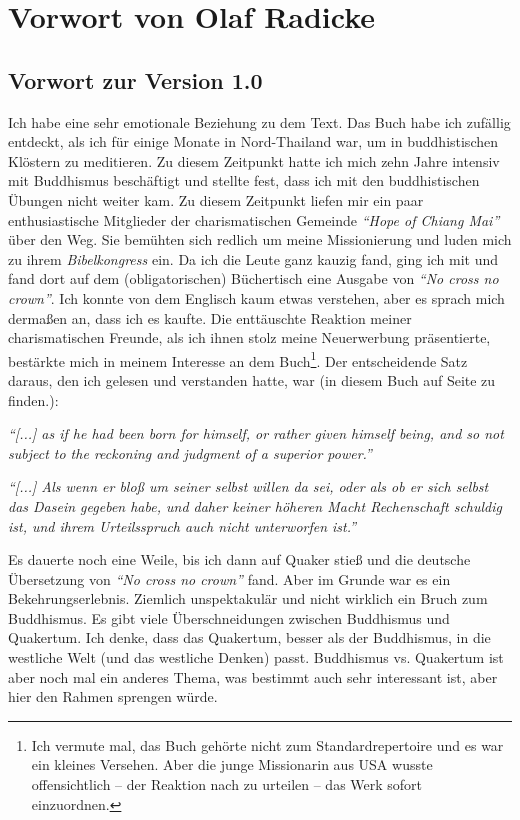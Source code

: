 \part{Vorwort von Olaf Radicke}

\chapter{Vorwort zur Version 1.0}
Ich habe eine sehr emotionale Beziehung zu dem Text. Das Buch habe ich zufällig
entdeckt, als ich für einige Monate in Nord-Thailand war, um in
buddhistischen
Klöstern zu meditieren. Zu diesem Zeitpunkt hatte ich mich zehn Jahre intensiv
mit
Buddhismus beschäftigt und stellte fest, dass ich mit den buddhistischen Übungen
nicht weiter kam. Zu diesem Zeitpunkt liefen mir ein paar enthusiastische
Mitglieder der charismatischen Gemeinde \textit{"`Hope of Chiang Mai"'} über
den Weg. Sie bemühten sich redlich um meine Missionierung und luden mich zu
ihrem \textit{Bibelkongress} ein. Da ich die Leute ganz kauzig fand, ging ich
mit und fand dort auf dem (obligatorischen) Büchertisch eine Ausgabe
von \textit{"`No cross no crown"'}.
Ich konnte von dem Englisch kaum etwas verstehen, aber es sprach mich dermaßen
an, dass ich es kaufte. Die enttäuschte Reaktion meiner charismatischen Freunde,
als ich ihnen stolz meine Neuerwerbung präsentierte, bestärkte mich in meinem
Interesse an dem Buch\footnote{Ich vermute mal, das Buch gehörte nicht zum
Standardrepertoire und es war ein kleines Versehen. Aber die junge Missionarin
aus USA wusste offensichtlich -- der Reaktion nach zu urteilen -- das Werk
sofort einzuordnen.}. Der entscheidende Satz daraus, den ich gelesen und
verstanden hatte, war (in diesem Buch auf
Seite \pageref{ref:vorw_sinndes_lebens} zu finden.):

\begin{center}
\parbox{7,5cm}{
\textit{"`[...] as if he had been born for himself, or rather given himself being,
and so not subject to the reckoning and judgment of a superior power."'}

\medskip

\textit{"`[...] Als wenn er bloß um seiner selbst willen da sei, oder als ob er
sich selbst das Dasein gegeben habe, und daher keiner höheren Macht Rechenschaft
schuldig ist, und ihrem Urteilsspruch auch nicht unterworfen ist."'}
}
\end{center}

\medskip

Es dauerte noch eine Weile, bis ich dann auf Quaker stieß und die deutsche
Übersetzung von \textit{"`No cross no crown"'} fand. Aber im Grunde war es ein
Bekehrungserlebnis. Ziemlich unspektakulär und nicht wirklich ein Bruch zum
Buddhismus. Es gibt viele Überschneidungen zwischen Buddhismus und Quakertum.
Ich denke, dass das Quakertum, besser als der Buddhismus, in die westliche Welt
(und das westliche
Denken) passt. Buddhismus vs. Quakertum ist aber noch mal
ein anderes Thema, was bestimmt auch sehr interessant ist, aber hier den Rahmen
sprengen würde.

